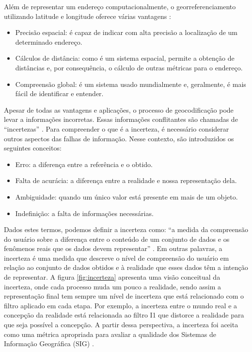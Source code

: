 Além de representar um endereço computacionalmente, o georreferenciamento utilizando latitude e longitude oferece várias vantagens \cite{longley2013}:

\begin{itemize}
   \item Precisão espacial: é capaz de indicar com alta precisão a localização de um determinado endereço.
   \item Cálculos de distância: como é um sistema espacial, permite a obtenção de distâncias e, por consequência, o cálculo de outras métricas para o endereço.
   \item Compreensão global: é um sistema usado mundialmente e, geralmente, é mais fácil de identificar e entender.
\end{itemize}

Apesar de todas as vantagens e aplicações, o processo de geocodificação pode levar a informações incorretas. Essas informações conflitantes são chamadas de ``incertezas'' \cite{longley2013}. Para compreender o que é a incerteza, é necessário considerar outros aspectos das falhas de informação. Nesse contexto, são introduzidos os seguintes conceitos:

\begin{itemize}
   \item Erro: a diferença entre a referência e o obtido.
   \item Falta de acurácia: a diferença entre a realidade e nossa representação dela.
   \item Ambiguidade: quando um único valor está presente em mais de um objeto.
   \item Indefinição: a falta de informações necessárias.
\end{itemize}

Dados estes termos, podemos definir a incerteza como: ``a medida da compreensão do usuário sobre a diferença entre o conteúdo de um conjunto de dados e os fenômenos reais que os dados devem representar'' \cite{longley2013}. Em outras palavras, a incerteza é uma medida que descreve o nível de compreensão do usuário em relação ao conjunto de dados obtidos e à realidade que esses dados têm a intenção de representar. A figura \ref{fig:incerteza} apresenta uma visão conceitual da incerteza, onde cada processo muda um pouco a realidade, sendo assim a representação final tem sempre um nível de incerteza que está relacionado com o filtro aplicado em cada etapa. Por exemplo, a incerteza entre o mundo real e a concepção da realidade está relacionada ao filtro I1 que distorce a realidade para que seja possível a concepção.  A partir dessa perspectiva, a incerteza foi aceita como uma métrica apropriada para avaliar a qualidade dos Sistemas de Informação Geográfica (SIG) \cite{longley2013}.

